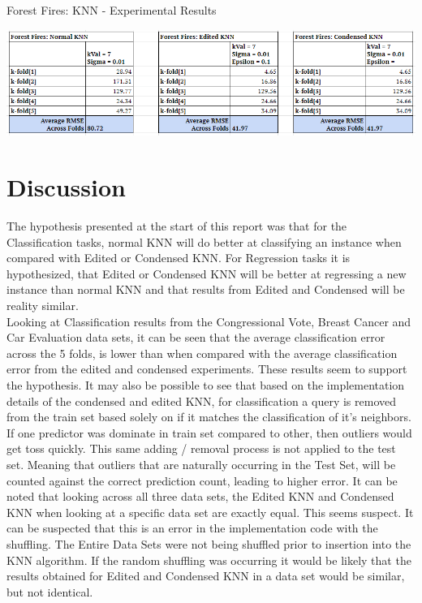 \documentclass[twoside,11pt]{article}
\begin{document}
\begin{table}[h]
	\centering
	\caption{Forest Fires: KNN - Experimental Results}
	\label{tab:table6}
	\includegraphics[scale=.7]{FF_ALL_Results}\newline
\end{table}





\newpage
\newline
\section{Discussion}
\hspace*{10mm} The hypothesis presented at the start of this report was that for the Classification tasks, normal KNN will do better at classifying an instance when compared with Edited or Condensed KNN. For Regression tasks it is hypothesized, that Edited or Condensed KNN will be better at regressing a new instance than normal KNN and that results from Edited and Condensed will be reality similar.\\
\hspace*{10mm} Looking at Classification results from the Congressional Vote, Breast Cancer and Car Evaluation data sets, it can be seen that the average classification error across the 5 folds, is lower than when compared with the average classification error from the edited and condensed experiments. These results seem to support the hypothesis. It may also be possible to see that based on the implementation details of the condensed and edited KNN, for classification a query is removed from the train set based solely on if it matches the classification of it's neighbors. If one predictor was dominate in train set compared to other, then outliers would get toss quickly. This same adding / removal process is not applied to the test set. Meaning that outliers that are naturally occurring in the Test Set, will be counted against the correct prediction count, leading to higher error. It can be noted that looking across all three data sets, the Edited KNN and Condensed KNN when looking at a specific data set are exactly equal. This seems suspect. It can be suspected that this is an error in the implementation code with the shuffling. The Entire Data Sets were not being shuffled prior to insertion into the KNN algorithm. If the random shuffling was occurring it would be likely that the results obtained for Edited and Condensed KNN in a data set would be similar, but not identical.\\
\end{document}
